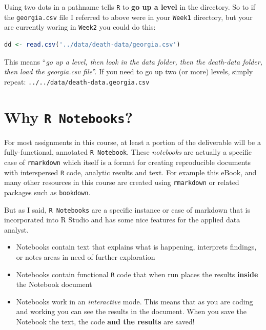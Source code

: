 \documentclass[
]{book}
\newcommand{\passthrough}[1]{#1}
\providecommand{\tightlist}{%
  \setlength{\itemsep}{0pt}\setlength{\parskip}{0pt}}
\begin{document}
Using two dots in a pathname tells \passthrough{\lstinline!R!} to \textbf{go up a level} in the directory. So to if the \passthrough{\lstinline!georgia.csv!} file I referred to above were in your \passthrough{\lstinline!Week1!} directory, but your are currently woring in \passthrough{\lstinline!Week2!} you could do this:

\begin{lstlisting}[language=R]
dd <- read.csv('../data/death-data/georgia.csv')
\end{lstlisting}

This means ``\emph{go up a level, then look in the data folder, then the death-data folder, then load the georgia.csv file}''. If you need to go up two (or more) levels, simply repeat: \passthrough{\lstinline!../../data/death-data.georgia.csv!}

\hypertarget{why-r-notebooks}{%
\section*{\texorpdfstring{Why \texttt{R\ Notebooks}?}{Why R Notebooks?}}\label{why-r-notebooks}}

For most assignments in this course, at least a portion of the deliverable will be a fully-functional, annotated \passthrough{\lstinline!R Notebook!}. These \emph{notebooks} are actually a specific case of \passthrough{\lstinline!rmarkdown!} which itself is a format for creating reproducible documents with interspersed \passthrough{\lstinline!R!} code, analytic results and text. For example this eBook, and many other resources in this course are created using \passthrough{\lstinline!rmarkdown!} or related packages such as \passthrough{\lstinline!bookdown!}.

But as I said, \passthrough{\lstinline!R Notebooks!} are a specific instance or case of markdown that is incorporated into R Studio and has some nice features for the applied data analyst.

\begin{itemize}
\tightlist
\item
  Notebooks contain text that explains what is happening, interprets findings, or notes areas in need of further exploration
\item
  Notebooks contain functional \passthrough{\lstinline!R!} code that when run places the results \textbf{inside} the Notebook document
\item
  Notebooks work in an \emph{interactive} mode. This means that as you are coding and working you can see the results in the document. When you save the Notebook the text, the code \textbf{and the results} are saved!
\end{itemize}
\end{document}
